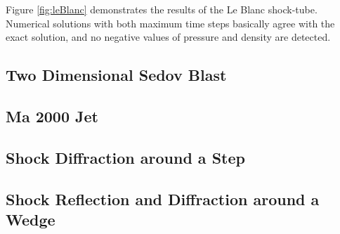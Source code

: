 \documentclass[preprint,12pt]{elsarticle}
\begin{document}
Figure \ref{fig:leBlanc} demonstrates 
the results of the Le Blanc shock-tube.
Numerical solutions with both maximum time steps 
basically agree with the exact solution, 
and no negative values of pressure and density are detected. 


\subsection{Two Dimensional Sedov Blast}

\subsection{Ma 2000 Jet}

\subsection{Shock Diffraction around a Step}

\subsection{Shock Reflection and Diffraction around a Wedge}


















\end{document}
